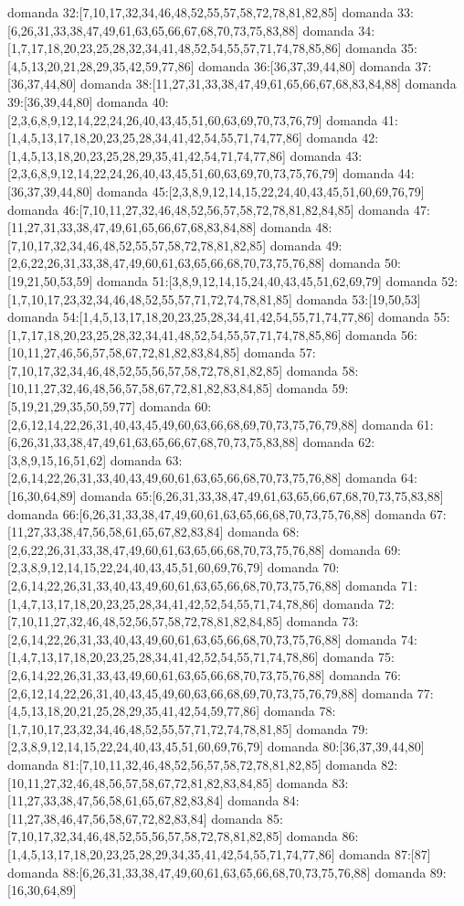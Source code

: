 domanda 32:[7,10,17,32,34,46,48,52,55,57,58,72,78,81,82,85]
domanda 33:[6,26,31,33,38,47,49,61,63,65,66,67,68,70,73,75,83,88]
domanda 34:[1,7,17,18,20,23,25,28,32,34,41,48,52,54,55,57,71,74,78,85,86]
domanda 35:[4,5,13,20,21,28,29,35,42,59,77,86]
domanda 36:[36,37,39,44,80]
domanda 37:[36,37,44,80]
domanda 38:[11,27,31,33,38,47,49,61,65,66,67,68,83,84,88]
domanda 39:[36,39,44,80]
domanda 40:[2,3,6,8,9,12,14,22,24,26,40,43,45,51,60,63,69,70,73,76,79]
domanda 41:[1,4,5,13,17,18,20,23,25,28,34,41,42,54,55,71,74,77,86]
domanda 42:[1,4,5,13,18,20,23,25,28,29,35,41,42,54,71,74,77,86]
domanda 43:[2,3,6,8,9,12,14,22,24,26,40,43,45,51,60,63,69,70,73,75,76,79]
domanda 44:[36,37,39,44,80]
domanda 45:[2,3,8,9,12,14,15,22,24,40,43,45,51,60,69,76,79]
domanda 46:[7,10,11,27,32,46,48,52,56,57,58,72,78,81,82,84,85]
domanda 47:[11,27,31,33,38,47,49,61,65,66,67,68,83,84,88]
domanda 48:[7,10,17,32,34,46,48,52,55,57,58,72,78,81,82,85]
domanda 49:[2,6,22,26,31,33,38,47,49,60,61,63,65,66,68,70,73,75,76,88]
domanda 50:[19,21,50,53,59]
domanda 51:[3,8,9,12,14,15,24,40,43,45,51,62,69,79]
domanda 52:[1,7,10,17,23,32,34,46,48,52,55,57,71,72,74,78,81,85]
domanda 53:[19,50,53]
domanda 54:[1,4,5,13,17,18,20,23,25,28,34,41,42,54,55,71,74,77,86]
domanda 55:[1,7,17,18,20,23,25,28,32,34,41,48,52,54,55,57,71,74,78,85,86]
domanda 56:[10,11,27,46,56,57,58,67,72,81,82,83,84,85]
domanda 57:[7,10,17,32,34,46,48,52,55,56,57,58,72,78,81,82,85]
domanda 58:[10,11,27,32,46,48,56,57,58,67,72,81,82,83,84,85]
domanda 59:[5,19,21,29,35,50,59,77]
domanda 60:[2,6,12,14,22,26,31,40,43,45,49,60,63,66,68,69,70,73,75,76,79,88]
domanda 61:[6,26,31,33,38,47,49,61,63,65,66,67,68,70,73,75,83,88]
domanda 62:[3,8,9,15,16,51,62]
domanda 63:[2,6,14,22,26,31,33,40,43,49,60,61,63,65,66,68,70,73,75,76,88]
domanda 64:[16,30,64,89]
domanda 65:[6,26,31,33,38,47,49,61,63,65,66,67,68,70,73,75,83,88]
domanda 66:[6,26,31,33,38,47,49,60,61,63,65,66,68,70,73,75,76,88]
domanda 67:[11,27,33,38,47,56,58,61,65,67,82,83,84]
domanda 68:[2,6,22,26,31,33,38,47,49,60,61,63,65,66,68,70,73,75,76,88]
domanda 69:[2,3,8,9,12,14,15,22,24,40,43,45,51,60,69,76,79]
domanda 70:[2,6,14,22,26,31,33,40,43,49,60,61,63,65,66,68,70,73,75,76,88]
domanda 71:[1,4,7,13,17,18,20,23,25,28,34,41,42,52,54,55,71,74,78,86]
domanda 72:[7,10,11,27,32,46,48,52,56,57,58,72,78,81,82,84,85]
domanda 73:[2,6,14,22,26,31,33,40,43,49,60,61,63,65,66,68,70,73,75,76,88]
domanda 74:[1,4,7,13,17,18,20,23,25,28,34,41,42,52,54,55,71,74,78,86]
domanda 75:[2,6,14,22,26,31,33,43,49,60,61,63,65,66,68,70,73,75,76,88]
domanda 76:[2,6,12,14,22,26,31,40,43,45,49,60,63,66,68,69,70,73,75,76,79,88]
domanda 77:[4,5,13,18,20,21,25,28,29,35,41,42,54,59,77,86]
domanda 78:[1,7,10,17,23,32,34,46,48,52,55,57,71,72,74,78,81,85]
domanda 79:[2,3,8,9,12,14,15,22,24,40,43,45,51,60,69,76,79]
domanda 80:[36,37,39,44,80]
domanda 81:[7,10,11,32,46,48,52,56,57,58,72,78,81,82,85]
domanda 82:[10,11,27,32,46,48,56,57,58,67,72,81,82,83,84,85]
domanda 83:[11,27,33,38,47,56,58,61,65,67,82,83,84]
domanda 84:[11,27,38,46,47,56,58,67,72,82,83,84]
domanda 85:[7,10,17,32,34,46,48,52,55,56,57,58,72,78,81,82,85]
domanda 86:[1,4,5,13,17,18,20,23,25,28,29,34,35,41,42,54,55,71,74,77,86]
domanda 87:[87]
domanda 88:[6,26,31,33,38,47,49,60,61,63,65,66,68,70,73,75,76,88]
domanda 89:[16,30,64,89]


